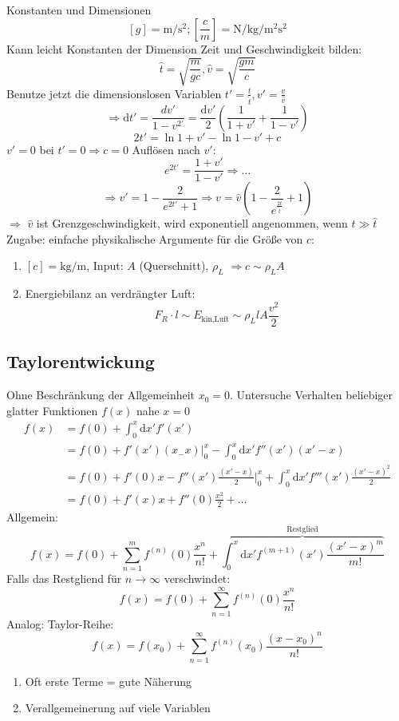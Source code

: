 \documentclass[a4paper]{scrartcl}
\renewcommand{\d}{\mathrm{d}}
\theoremstyle{definition}
\theoremstyle{plain}
\theoremstyle{remark}
\begin{document}
Konstanten und Dimensionen
\[[g] = \si{\meter\per\second\squared};[\frac{c}{m}] = \si{\newton\per\kilo\gram\per\meter\squared\second\squared}\]
Kann leicht Konstanten der Dimension Zeit und Geschwindigkeit bilden:
\[\hat{t} = \sqrt{\frac{m}{g c}},\hat{v} = \sqrt{\frac{g m}{c}}\]
Benutze jetzt die dimensionslosen Variablen $t' = \frac{t}{\hat{t}},v'=\frac{v}{\hat{v}}$
\[\Rightarrow \d t' = \frac{d v'}{1 - v^{2\prime}} = \frac{\d v'}{2}(\frac{1}{1 + v'} + \frac{1}{1 - v'})\]
\[2t' = \ln{1 + v'} - \ln{1 - v'} + c\]
$v' = 0$ bei $t' = 0 \Rightarrow c = 0$
Auflösen nach $v'$: \[e^{2t'} = \frac{1 + v'}{1 - v'} \Rightarrow \ldots\]
\[\Rightarrow v' = 1 - \frac{2}{e^{2t'} + 1} \Rightarrow v = \hat{v}(1 - \frac{2}{e^{\frac{2t}{\hat{t}}}} + 1)\]
$\Rightarrow$ $\hat{v}$ ist Grenzgeschwindigkeit, wird exponentiell angenommen, wenn $t \gg \hat{t}$ \\

Zugabe: einfache physikalische Argumente für die Größe von $c$:
\begin{enumerate}
\item $[c] = \si{\kilo\gram\per\meter}$, Input: $A$ (Querschnitt), $\rho_L$
         $\Rightarrow c \sim \rho_L A$
\item Energiebilanz an verdrängter Luft: \[F_R\cdot l \sim E_{\text{kin,Luft}}\sim\rho_L l A \frac{v^2}{2}\]
\end{enumerate}
\subsection{Taylorentwickung}
\label{sec-3-4}
Ohne Beschränkung der Allgemeinheit $x_0 = 0$. Untersuche Verhalten beliebiger glatter Funktionen $f(x)$ nahe $x = 0$
\begin{align*}
f(x) &= f(0) + \int_0^x\d x' f'(x') \\
&= f(0) + f'(x')(x_ - x)\Big|_0^x - \int_0^x\d x' f''(x')(x'-x) \\
&= f(0) + f'(0)x - f''(x')\frac{(x' - x)}{2}\Big|_0^x + \int_0^x\d x' f'''(x')\frac{(x' - x)^2}{2} \\
&= f(0) + f'(x)x + f''(0)\frac{x^2}{2} + \ldots
\end{align*}
Allgemein:
\[f(x) = f(0) + \sum_{n=1}^m f^{(n)}(0)\frac{x^n}{n!}+\overbrace{\int_0^x \d x' f^{(m+1)}(x')\frac{(x' - x)^m}{m!}}^{\text{Restglied}}\]
Falls das Restgliend für $n\to\infty$ verschwindet:
\[f(x) = f(0) + \sum_{n=1}^\infty f^{(n)}(0)\frac{x^n}{n!}\]
Analog:
Taylor-Reihe: \[f(x) = f(x_0) + \sum_{n=1}^\infty f^{(n)}(x_0)\frac{(x - x_0)^n}{n!}\]
\begin{enumerate}
\item Oft erste Terme = gute Näherung
\item Verallgemeinerung auf viele Variablen
\end{enumerate}
\end{document}
